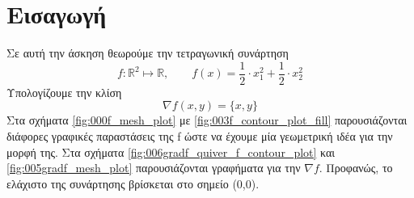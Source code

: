 \chapter{Εισαγωγή} \label{intro}

Σε αυτή την άσκηση θεωρούμε την τετραγωνική συνάρτηση
\begin{equation}
	\label{eq:f-definition}
	f:\mathbb{R}^{2} \mapsto \mathbb{R}, \qquad f(x) = \frac{1}{2} \cdot x_1 ^ 2 + \frac{1}{2} \cdot x_2^2
\end{equation}
Υπολογίζουμε την κλίση 
\begin{equation}
	\label{eq:f-nabla}
	\nabla f(x, y) = \{x, y\}
\end{equation}
Στα σχήματα \ref{fig:000f_mesh_plot} με \ref{fig:003f_contour_plot_fill} παρουσιάζονται διάφορες γραφικές παραστάσεις της f ώστε να έχουμε μία γεωμετρική ιδέα για την μορφή της. Στα σχήματα \ref{fig:006gradf_quiver_f_contour_plot} και \ref{fig:005gradf_mesh_plot} παρουσιάζονται γραφήματα για την $\nabla f$. \newline
Προφανώς, το ελάχιστο της συνάρτησης βρίσκεται στο σημείο (0,0).

